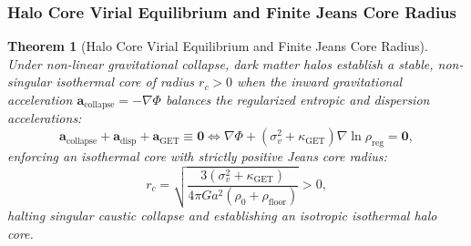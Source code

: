 \documentclass[11pt]{article}
\theoremstyle{plain}
\newtheorem{theorem}{Theorem}
\begin{document}
\subsubsection{Halo Core Virial Equilibrium and Finite Jeans Core Radius}
\begin{theorem}[Halo Core Virial Equilibrium and Finite Jeans Core Radius]
Under non-linear gravitational collapse, dark matter halos establish a stable, non-singular isothermal core of radius $r_c > 0$ when the inward gravitational acceleration $\mathbf{a}_{\mathrm{collapse}} = -\nabla \Phi$ balances the regularized entropic and dispersion accelerations:
\begin{equation}
\label{eq:virial_equilibrium}
\mathbf{a}_{\mathrm{collapse}} + \mathbf{a}_{\mathrm{disp}} + \mathbf{a}_{\mathrm{GET}} \equiv \mathbf{0} \iff \nabla \Phi + (\sigma_v^2 + \kappa_{\mathrm{GET}}) \nabla \ln \rho_{\mathrm{reg}} = \mathbf{0},
\end{equation}
enforcing an isothermal core with strictly positive Jeans core radius:
\begin{equation}
r_c = \sqrt{ \frac{3(\sigma_v^2 + \kappa_{\mathrm{GET}})}{4\pi G a^2 (\rho_0 + \rho_{\mathrm{floor}})} } > 0,
\end{equation}
halting singular caustic collapse and establishing an isotropic isothermal halo core.
\end{theorem}
\end{document}
